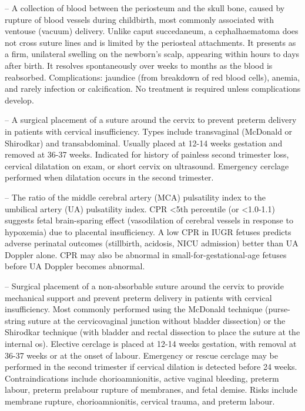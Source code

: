 -- A collection of blood between the periosteum and the skull bone, caused by rupture of blood vessels during childbirth, most commonly associated with ventouse (vacuum) delivery. Unlike caput succedaneum, a cephalhaematoma does not cross suture lines and is limited by the periosteal attachments. It presents as a firm, unilateral swelling on the newborn's scalp, appearing within hours to days after birth. It resolves spontaneously over weeks to months as the blood is reabsorbed. Complications: jaundice (from breakdown of red blood cells), anemia, and rarely infection or calcification. No treatment is required unless complications develop.

-- A surgical placement of a suture around the cervix to prevent preterm delivery in patients with cervical insufficiency. Types include transvaginal (McDonald or Shirodkar) and transabdominal. Usually placed at 12-14 weeks gestation and removed at 36-37 weeks. Indicated for history of painless second trimester loss, cervical dilatation on exam, or short cervix on ultrasound. Emergency cerclage performed when dilatation occurs in the second trimester.

-- The ratio of the middle cerebral artery (MCA) pulsatility index to the umbilical artery (UA) pulsatility index. CPR <5th percentile (or <1.0-1.1) suggests fetal brain-sparing effect (vasodilation of cerebral vessels in response to hypoxemia) due to placental insufficiency. A low CPR in IUGR fetuses predicts adverse perinatal outcomes (stillbirth, acidosis, NICU admission) better than UA Doppler alone. CPR may also be abnormal in small-for-gestational-age fetuses before UA Doppler becomes abnormal.

-- Surgical placement of a non-absorbable suture around the cervix to provide mechanical support and prevent preterm delivery in patients with cervical insufficiency. Most commonly performed using the McDonald technique (purse-string suture at the cervicovaginal junction without bladder dissection) or the Shirodkar technique (with bladder and rectal dissection to place the suture at the internal os). Elective cerclage is placed at 12-14 weeks gestation, with removal at 36-37 weeks or at the onset of labour. Emergency or rescue cerclage may be performed in the second trimester if cervical dilation is detected before 24 weeks. Contraindications include chorioamnionitis, active vaginal bleeding, preterm labour, preterm prelabour rupture of membranes, and fetal demise. Risks include membrane rupture, chorioamnionitis, cervical trauma, and preterm labour.

